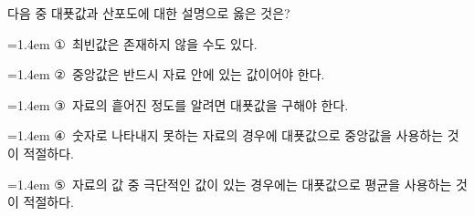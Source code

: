 다음 중 대푯값과 산포도에 대한 설명으로 옳은 것은?
\par\medskip\par\noindent\hangindent=1.4em {\small ①}\ 최빈값은 존재하지 않을 수도 있다.\par\noindent\hangindent=1.4em {\small ②}\ 중앙값은 반드시 자료 안에 있는 값이어야 한다.\par\noindent\hangindent=1.4em {\small ③}\ 자료의 흩어진 정도를 알려면 대푯값을 구해야 한다.\par\noindent\hangindent=1.4em {\small ④}\ 숫자로 나타내지 못하는 자료의 경우에 대푯값으로 중앙값을 사용하는 것이 적절하다.\par\noindent\hangindent=1.4em {\small ⑤}\ 자료의 값 중 극단적인 값이 있는 경우에는 대푯값으로 평균을 사용하는 것이 적절하다.\par\medskip
